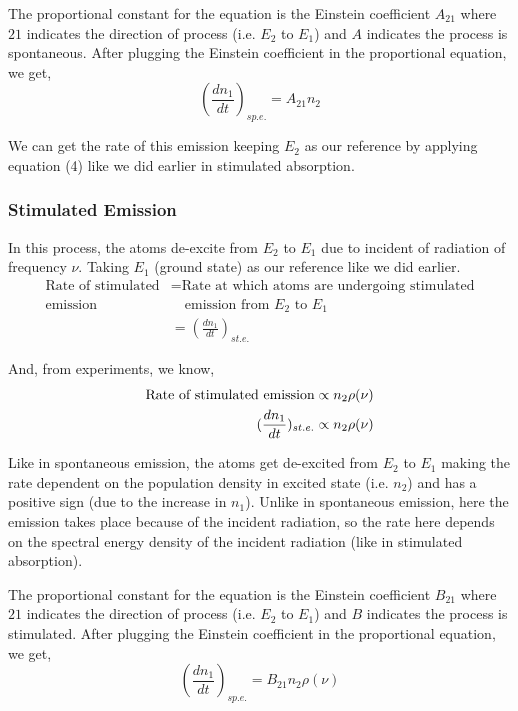 \documentclass[12pt]{article}
\begin{document}
The proportional constant for the equation is the Einstein coefficient $A_{21}$ where $21$ indicates the direction of process (i.e. $E_{2}$ to $E_{1}$) and $A$ indicates the process is spontaneous. After plugging the Einstein coefficient in the proportional equation, we get,
\begin{equation}
    (\frac{dn_{1}}{dt})_{sp.e.} = A_{21}n_{2}
\end{equation}

We can get the rate of this emission keeping $E_{2}$ as our reference by applying equation (4) like we did earlier in stimulated absorption.

\subsubsection{Stimulated Emission}

In this process, the atoms de-excite from $E_{2}$ to $E_{1}$ due to incident of radiation of frequency $\nu$. Taking $E_{1}$ (ground state) as our reference like we did earlier.
\begin{align*}
    \text{Rate of stimulated} & = \text{Rate at which atoms are undergoing stimulated} \\
    \text{emission} & \quad \text{emission from } E_{2} \text{ to } E_{1} \\ 
    & = (\frac{dn_{1}}{dt})_{st.e.}
\end{align*}

And, from experiments, we know, 
\begin{align*}
    \textnormal{Rate of stimulated emission} \propto n_{2}\rho(\nu) \\ 
    (\frac{dn_{1}}{dt})_{st.e.} \propto n_{2}\rho(\nu)
\end{align*}

Like in spontaneous emission, the atoms get de-excited from $E_{2}$ to $E_{1}$ making the rate dependent on the population density in excited state (i.e. $n_{2}$) and has a positive sign (due to the increase in $n_{1}$). Unlike in spontaneous emission, here the emission takes place because of the incident radiation, so the rate here depends on the spectral energy density of the incident radiation (like in stimulated absorption). \vspace{.2cm}

The proportional constant for the equation is the Einstein coefficient $B_{21}$ where $21$ indicates the direction of process (i.e. $E_{2}$ to $E_{1}$) and $B$ indicates the process is stimulated. After plugging the Einstein coefficient in the proportional equation, we get,
\begin{equation}
    (\frac{dn_{1}}{dt})_{sp.e.} = B_{21}n_{2}\rho(\nu)
\end{equation}
\end{document}
